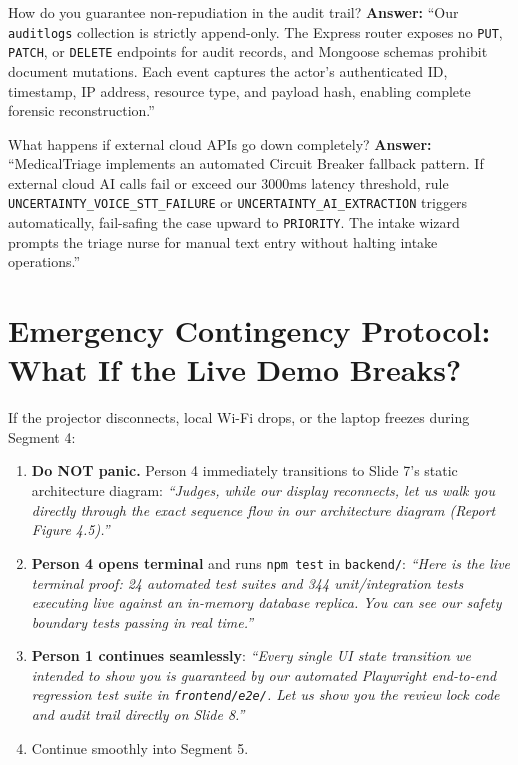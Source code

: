 \documentclass[11pt,a4paper]{article}
\begin{document}
\begin{qabox}{How do you guarantee non-repudiation in the audit trail?}
\textbf{Answer:} ``Our \texttt{auditlogs} collection is strictly append-only. The Express router exposes no \texttt{PUT}, \texttt{PATCH}, or \texttt{DELETE} endpoints for audit records, and Mongoose schemas prohibit document mutations. Each event captures the actor's authenticated ID, timestamp, IP address, resource type, and payload hash, enabling complete forensic reconstruction.''
\end{qabox}

\begin{qabox}{What happens if external cloud APIs go down completely?}
\textbf{Answer:} ``MedicalTriage implements an automated Circuit Breaker fallback pattern. If external cloud AI calls fail or exceed our 3000ms latency threshold, rule \texttt{UNCERTAINTY\_VOICE\_STT\_FAILURE} or \texttt{UNCERTAINTY\_AI\_EXTRACTION} triggers automatically, fail-safing the case upward to \texttt{PRIORITY}. The intake wizard prompts the triage nurse for manual text entry without halting intake operations.''
\end{qabox}

\vspace{4mm}

\section*{Emergency Contingency Protocol: What If the Live Demo Breaks?}

If the projector disconnects, local Wi-Fi drops, or the laptop freezes during Segment 4:
\begin{enumerate}[leftmargin=18pt]
  \item \textbf{Do NOT panic.} Person 4 immediately transitions to Slide 7's static architecture diagram:
  \textit{``Judges, while our display reconnects, let us walk you directly through the exact sequence flow in our architecture diagram (Report Figure 4.5).''}
  \item \textbf{Person 4 opens terminal} and runs \texttt{npm test} in \texttt{backend/}:
  \textit{``Here is the live terminal proof: 24 automated test suites and 344 unit/integration tests executing live against an in-memory database replica. You can see our safety boundary tests passing in real time.''}
  \item \textbf{Person 1 continues seamlessly}:
  \textit{``Every single UI state transition we intended to show you is guaranteed by our automated Playwright end-to-end regression test suite in \texttt{frontend/e2e/}. Let us show you the review lock code and audit trail directly on Slide 8.''}
  \item Continue smoothly into Segment 5.
\end{enumerate}
\end{document}
